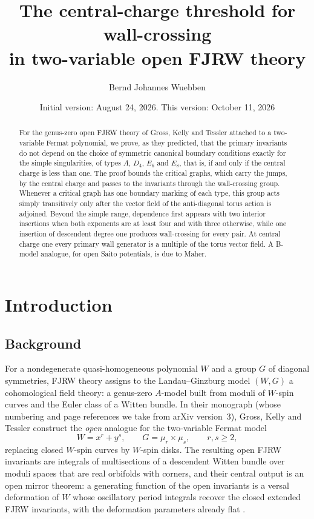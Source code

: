\documentclass[11pt]{amsart}
\title[The central-charge threshold for wall-crossing in open FJRW theory]{The
central-charge threshold for wall-crossing\\ in two-variable open FJRW theory}
\author{Bernd Johannes Wuebben}
\date{Initial version: August 24, 2026. This version: October 11, 2026}
\theoremstyle{definition}
\theoremstyle{remark}
\begin{document}
\begin{abstract}
For the genus-zero open FJRW theory of Gross, Kelly and Tessler attached to a
two-variable Fermat polynomial, we prove, as they predicted, that the primary
invariants do not depend on the choice of symmetric canonical boundary
conditions exactly for the simple singularities, of types $A$, $D_4$, $E_6$
and $E_8$, that is, if and only if the central charge is less than one.  The
proof bounds the critical graphs, which carry the jumps, by the central charge
and passes to the invariants through the wall-crossing group.  Whenever a critical
graph has one boundary marking of each type, this group acts simply
transitively only after the vector field of the anti-diagonal torus action is
adjoined.  Beyond the simple range, dependence first
appears with two interior insertions when both exponents are at least four
and with three otherwise, while one insertion of descendent degree one
produces wall-crossing for every pair.  At central charge one every primary
wall generator is a multiple of the torus vector field.  A B-model analogue, for open
Saito potentials, is due to Maher.
\end{abstract}

\maketitle
\enlargethispage{3pt}

\section{Introduction}
\label{sec:intro}

\subsection*{Background}
For a nondegenerate quasi-homogeneous polynomial $W$ and a group $G$ of diagonal
symmetries, FJRW theory \cite{FJR13} assigns to the Landau--Ginzburg model
$(W,G)$ a cohomological field theory: a genus-zero $A$-model built from moduli
of $W$-spin curves and the Euler class of a Witten bundle. In their monograph
\cite{GKT} (whose numbering and page references we take from arXiv
version~3), Gross, Kelly and Tessler construct the \emph{open} analogue for the
two-variable Fermat model
\[
W=x^{r}+y^{s},\qquad G=\mu_{r}\times\mu_{s},\qquad r,s\geq 2,
\]
replacing closed $W$-spin curves by $W$-spin disks. The resulting open FJRW
invariants are integrals of multisections of a descendent Witten bundle over
moduli spaces that are real orbifolds with corners, and their central output is
an open mirror theorem: a generating function of the open invariants is a versal
deformation of $W$ whose oscillatory period integrals recover the closed
extended FJRW invariants, with the deformation parameters already flat
\cite[Theorem~0.3]{GKT}.
\end{document}
